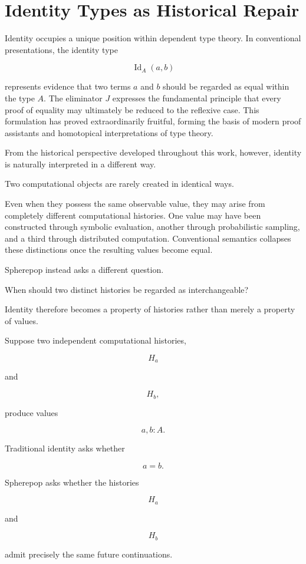 \documentclass[12pt,oneside]{article}
\theoremstyle{definition}
\theoremstyle{remark}
\begin{document}
\section{Identity Types as Historical Repair}

Identity occupies a unique position within dependent type theory. In
conventional presentations, the identity type

\[
\operatorname{Id}_A(a,b)
\]

represents evidence that two terms \(a\) and \(b\) should be regarded as
equal within the type \(A\). The eliminator \(J\) expresses the fundamental
principle that every proof of equality may ultimately be reduced to the
reflexive case. This formulation has proved extraordinarily fruitful, forming
the basis of modern proof assistants and homotopical interpretations of type
theory.

From the historical perspective developed throughout this work, however,
identity is naturally interpreted in a different way.

Two computational objects are rarely created in identical ways.

Even when they possess the same observable value, they may arise from
completely different computational histories. One value may have been
constructed through symbolic evaluation, another through probabilistic
sampling, and a third through distributed computation. Conventional semantics
collapses these distinctions once the resulting values become equal.

Spherepop instead asks a different question.

When should two distinct histories be regarded as interchangeable?

Identity therefore becomes a property of histories rather than merely a
property of values.

Suppose two independent computational histories,

\[
H_a
\]

and

\[
H_b,
\]

produce values

\[
a,b:A.
\]

Traditional identity asks whether

\[
a=b.
\]

Spherepop asks whether the histories

\[
H_a
\]

and

\[
H_b
\]

admit precisely the same future continuations.
\end{document}
